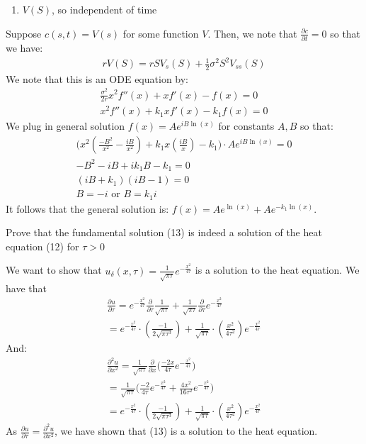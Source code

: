 \documentclass[12pt,twoside, letter]{exam}
\theoremstyle{definition}
\begin{document}
\begin{enumerate}
\begin{enumerate}
      \item $V(S)$, so independent of time
    \end{enumerate}
    \begin{solution}
      Suppose $c(s,t) = V(s)$ for some function $V$. Then, we note that $\frac{\partial c}{\partial t}=0$ so that we have:
      \begin{align*}
        rV(S) = rSV_s(S) + \frac{1}{2} \sigma^2 S^2V_{ss}(S)
      \end{align*}
      We note that this is an ODE equation by:
      \begin{align*}
        \frac{\sigma^2}{2r} x^2f''(x) + x f'(x) - f(x) = 0 \\
        x^2f''(x) + k_1 xf'(x) - k_1 f(x) = 0
      \end{align*}
      We plug in general solution $f(x) = Ae^{iB\ln(x)}$ for constants $A, B$ so  that:
      \begin{align*}
        \bigg(x^2(\frac{-B^2}{x^2} - \frac{iB}{x^2}) + k_1x(\frac{iB}{x}) - k_1\bigg) \cdot Ae^{iB\ln(x)} = 0 \\
        -B^2 - iB + ik_1B - k_1 = 0\\
        (iB + k_1)(iB - 1) = 0\\
        B = -i \text{ or } B = k_1 i
      \end{align*}
      It follows that the general solution is: $f(x) = Ae^{\ln(x)} + Ae^{-k_1 \ln(x)}$.
    \end{solution}
\end{enumerate}

  \par{Prove that the fundamental solution (13) is indeed a solution of the heat equation (12) for $\tau > 0$}
    \begin{solution}
      We want to show that $u_{\delta}(x, \tau) = \frac{1}{\sqrt{\pi\tau}}e^{-\frac{x^2}{4\tau}}$ is a solution to the heat equation.
      We have that
      \begin{align*}
        \frac{\partial u}{\partial \tau} = e^{-\frac{x^2}{4\tau}}\frac{\partial}{\partial \tau}\frac{1}{\sqrt{\pi\tau}} + \frac{1}{\sqrt{\pi\tau}}\frac{\partial}{\partial \tau}e^{-\frac{x^2}{4\tau}} \\
        = e^{-\frac{x^2}{4\tau}}\cdot (\frac{-1}{2\sqrt{\pi\tau^3}}) + \frac{1}{\sqrt{\pi\tau}}\cdot (\frac{x^2}{4\tau^2}) e^{-\frac{x^2}{4\tau}}
      \end{align*}
      And:
      \begin{align*}
        \frac{\partial^2 u}{\partial x^2} = \frac{1}{\sqrt{\pi\tau}} \frac{\partial}{\partial x} \bigg(\frac{-2x}{4\tau}e^{-\frac{x^2}{4\tau}}\bigg) \\
        = \frac{1}{\sqrt{\pi\tau}} \bigg(\frac{-2}{4\tau}e^{-\frac{x^2}{4\tau}} + \frac{4x^2}{16\tau^2}e^{-\frac{x^2}{4\tau}} \bigg)\\
        = e^{-\frac{x^2}{4\tau}}\cdot (\frac{-1}{2\sqrt{\pi\tau^3}}) + \frac{1}{\sqrt{\pi\tau}}\cdot (\frac{x^2}{4\tau^2}) e^{-\frac{x^2}{4\tau}}
      \end{align*}
      As $\frac{\partial u}{\partial \tau} = \frac{\partial^2 u}{\partial x^2}$, we have shown that (13) is a solution to the heat equation.
    \end{solution}
\end{document}

